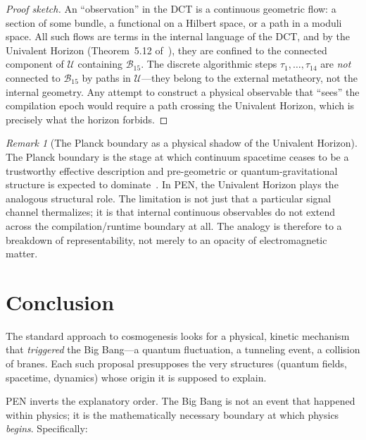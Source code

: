 \documentclass[11pt,a4paper]{article}
\theoremstyle{plain}
\theoremstyle{definition}
\theoremstyle{remark}
\newtheorem{remark}[theorem]{Remark}
\newcommand{\U}{\mathcal{U}}
\newcommand{\B}{\mathcal{B}}
\begin{document}
\begin{proof}[Proof sketch]
An ``observation'' in the DCT is a continuous geometric flow: a section of some bundle, a functional on a Hilbert space, or a path in a moduli space.
All such flows are terms in the internal language of the DCT, and by the Univalent Horizon (Theorem~5.12 of~\cite{pen}), they are confined to the connected component of $\U$ containing $\B_{15}$.
The discrete algorithmic steps $\tau_1, \ldots, \tau_{14}$ are \emph{not} connected to $\B_{15}$ by paths in $\U$---they belong to the external metatheory, not the internal geometry.
Any attempt to construct a physical observable that ``sees'' the compilation epoch would require a path crossing the Univalent Horizon, which is precisely what the horizon forbids.
\end{proof}

\begin{remark}[The Planck boundary as a physical shadow of the Univalent Horizon]
\label{rem:planck}
The Planck boundary is the stage at which continuum spacetime ceases to be a trustworthy effective description and pre-geometric or quantum-gravitational structure is expected to dominate~\cite{mukhanov}.
In PEN, the Univalent Horizon plays the analogous structural role.
The limitation is not just that a particular signal channel thermalizes; it is that internal continuous observables do not extend across the compilation/runtime boundary at all.
The analogy is therefore to a breakdown of representability, not merely to an opacity of electromagnetic matter.
\end{remark}


\section{Conclusion}
\label{sec:conclusion}

The standard approach to cosmogenesis looks for a physical, kinetic mechanism that \emph{triggered} the Big Bang---a quantum fluctuation, a tunneling event, a collision of branes.
Each such proposal presupposes the very structures (quantum fields, spacetime, dynamics) whose origin it is supposed to explain.

PEN inverts the explanatory order.
The Big Bang is not an event that happened within physics; it is the mathematically necessary boundary at which physics \emph{begins}.
Specifically:
\end{document}
